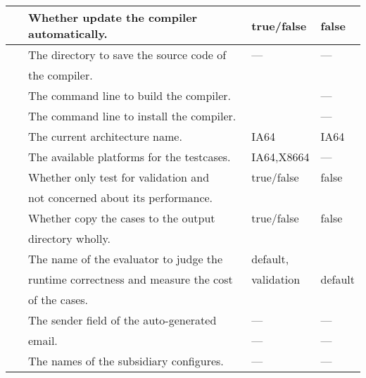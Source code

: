 \documentclass[a4paper]{article}
\begin{document}
\begin{table}[thbp]
\begin{tabular}{||c|l|l|l||}
                    \hline\hline
                    \verb\UPDATE_COMPILER\ & Whether update the compiler automatically. & true/false & false \\
                    \hline
                    \verb\COMPILER\    &   The directory to save the source code of & --- & --- \\
                                       &   the compiler. & & \\
                    \hline
                    \verb\BUILD\       &   The command line to build the compiler. & \verb\make all -f Make.native\ & ---  \\
                    \hline
                    \verb\INSTALL\     &   The command line to install the compiler. & \verb\./INSTALL.native\ & --- \\
                    \hline\
                    \verb\CURRENT_PLATFORM\ & The current architecture name. & IA64 & IA64 \\
                    \hline
                    \verb\PLATFORMS\ & The available platforms for the testcases. & IA64,X8664 & --- \\
                    \hline
                    \verb\VALIDATION_ONLY\ & Whether only test for validation and & true/false & false \\
                                        &  not concerned about its performance.   &            &        \\
                    \hline
                    \verb\WHOLE_COPY\   & Whether copy the cases to the output    & true/false & false \\
                                        & directory wholly.                        &            &       \\
                    \hline
                    \verb\EVALUATOR\   &  The name of the evaluator to judge the  & default,    &   \\
                                       &  runtime correctness and measure the cost & validation & default \\
                                       &  of the cases.                           &             &         \\
                    \hline
                    \verb\MAIL_SENDER\ &  The sender field of the auto-generated & --- & --- \\
                                       &  email.                                 & --- & --- \\
                    \hline
                    \verb\SUBCONF\     &  The names of the subsidiary configures. & --- & --- \\
                    \hline\hline
                \end{tabular}

            \end{table}
\end{document}
